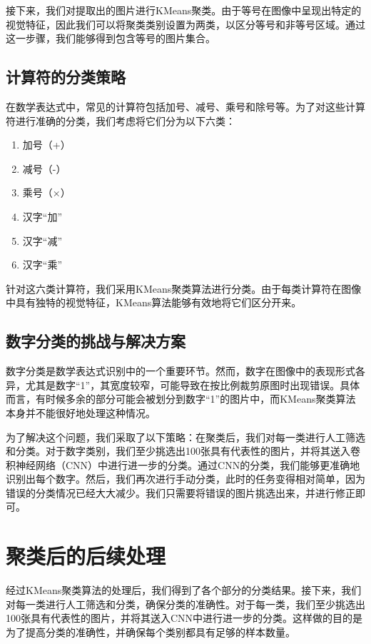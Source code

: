 接下来，我们对提取出的图片进行KMeans聚类。由于等号在图像中呈现出特定的视觉特征，因此我们可以将聚类类别设置为两类，以区分等号和非等号区域。通过这一步骤，我们能够得到包含等号的图片集合。

\subsection{计算符的分类策略}

在数学表达式中，常见的计算符包括加号、减号、乘号和除号等。为了对这些计算符进行准确的分类，我们考虑将它们分为以下六类：

\begin{enumerate}
	\item 加号（+）
	\item 减号（-）
	\item 乘号（×）
	\item 汉字“加”
	\item 汉字“减”
	\item 汉字“乘”
\end{enumerate}

针对这六类计算符，我们采用KMeans聚类算法进行分类。由于每类计算符在图像中具有独特的视觉特征，KMeans算法能够有效地将它们区分开来。

\subsection{数字分类的挑战与解决方案}

数字分类是数学表达式识别中的一个重要环节。然而，数字在图像中的表现形式各异，尤其是数字“1”，其宽度较窄，可能导致在按比例裁剪原图时出现错误。具体而言，有时候多余的部分可能会被划分到数字“1”的图片中，而KMeans聚类算法本身并不能很好地处理这种情况。

为了解决这个问题，我们采取了以下策略：在聚类后，我们对每一类进行人工筛选和分类。对于数字类别，我们至少挑选出100张具有代表性的图片，并将其送入卷积神经网络（CNN）中进行进一步的分类。通过CNN的分类，我们能够更准确地识别出每个数字。然后，我们再次进行手动分类，此时的任务变得相对简单，因为错误的分类情况已经大大减少。我们只需要将错误的图片挑选出来，并进行修正即可。

\section{聚类后的后续处理}

经过KMeans聚类算法的处理后，我们得到了各个部分的分类结果。接下来，我们对每一类进行人工筛选和分类，确保分类的准确性。对于每一类，我们至少挑选出100张具有代表性的图片，并将其送入CNN中进行进一步的分类。这样做的目的是为了提高分类的准确性，并确保每个类别都具有足够的样本数量。

